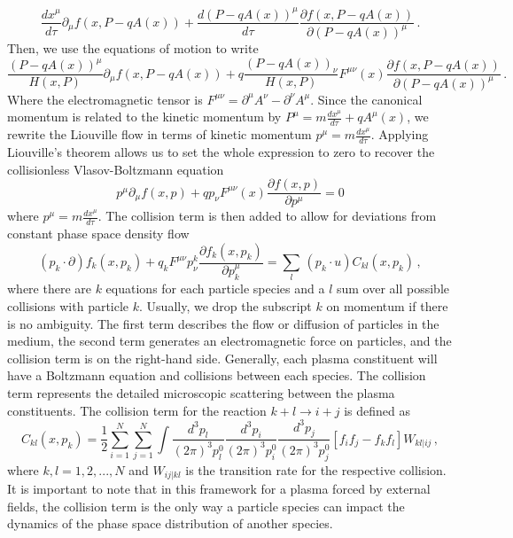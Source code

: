 \begin{equation}
 \frac{d x^{\mu}}{d \tau}\partial_\mu f(x,P-q A(x)) + \frac{d (P-q A(x))^{\mu}}{d \tau}\frac{\partial f(x,P-q A(x))}{\partial (P-q A(x))^{\mu}}\,.
\end{equation}
Then, we use the equations of motion to write
\begin{equation}
    \frac{(P-q A(x))^{\mu}}{H(x,P)} \partial_\mu f(x,P-q A(x)) + q\frac{(P-q A(x))_{\nu}}{H(x,P)} F^{\mu \nu}(x) \frac{\partial f(x,P-q A(x))}{\partial (P-q A(x))^{\mu}}\,.
\end{equation}
Where the electromagnetic tensor is $F^{\mu \nu} = \partial^{\mu} A^{\nu}  - \partial^{\nu}A^{\mu}$. 
Since the canonical momentum is related to the kinetic momentum by $ P^{\mu}  = m\frac{d x^{\mu}}{d \tau} + q A^{\mu}(x)$, we rewrite the Liouville flow in terms of kinetic momentum $p^\mu = m \frac{dx^\mu}{d\tau}$. Applying Liouville's theorem allows us to set the whole expression to zero to recover the collisionless Vlasov-Boltzmann equation
\begin{equation}
    p^{\mu} \partial_\mu f(x, p) + q  p_{\nu} F^{\mu \nu}(x) \frac{\partial f(x, p )}{\partial  p^{\mu} }=0
\end{equation}
where $ p^{\mu} = m\frac{d x^{\mu}}{d \tau}$. The collision term is then added to allow for deviations from constant phase space density flow
\begin{equation}\label{eq:VBE}
\boxed{(p_k \cdot \partial) f_k(x,p_k) + q_k F^{\mu\nu} p^k_\nu \frac{\partial f_k(x,p_k)}{\partial p_k^\mu} =\sum_l \, (p_k\cdot u)C_{kl}(x,p_k)}\,,
\end{equation}
where there are $k$ equations for each particle species and a $l$ sum over all possible collisions with particle $k$. Usually, we drop the subscript $k$ on momentum if there is no ambiguity. The first term describes the flow or diffusion of particles in the medium, the second term generates an electromagnetic force on particles, and the collision term is on the right-hand side. Generally, each plasma constituent will have a Boltzmann equation and collisions between each species. The collision term represents the detailed microscopic scattering between the plasma constituents. The collision term for the reaction $k+l\rightarrow i+j$ is defined as
\begin{equation}\label{eq:collisionMicro}
    C_{kl}(x,p_k) = \frac{1}{2}\sum^N_{i=1}\sum^N_{j=1}\int \frac{d^3p_l}{(2 \pi)^3p_l^0}\frac{d^3p_i}{(2 \pi)^3p_i^0}\frac{d^3p_j}{(2 \pi)^3p_j^0}\left[f_if_j -f_k f_l
    \right]W_{kl|ij}\,,
\end{equation}
where 
$k,l = 1,2,...,N$ and $W_{ij|kl}$ is the transition rate for the respective collision.
It is important to note that in this framework for a plasma forced by external fields, the collision term is the only way a particle species can impact the dynamics of the phase space distribution of another species.

